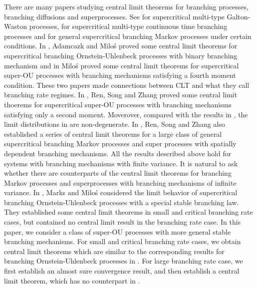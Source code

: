 \documentclass[12pt,a4paper]{amsart}
\theoremstyle{plain}
\theoremstyle{definition}
\numberwithin{equation}{section}
\begin{document}
    There are many papers studying central limit theorems for branching processes, branching diffusions and superprocesses. 
    See \cite{KestenStigum1966A-limit,KestenStigum1966Additional} for supercritical multi-type Galton-Waston processes, \cite{Athreya1969Limit,Athreya1969LimitB,Athreya1971Some} for supercritical multi-type continuous time branching processes and \cite{AsmussenHering1983Branching} for general supercritical branching Markov processes under certain conditions. 
    In \cite{AdamczakMilos2015CLT}, Adamcazk and Milo\'s proved some central limit theorems for supercritical branching Ornstein-Uhlenbeck processes with binary branching mechanism and in \cite{Milos2012Spatial} Milo\'s proved some central limit theorems for supercritical super-OU processes with branching mechanisms satisfying a fourth moment condition. 
    These two papers made connections between CLT and what they call branching rate regimes. 
    In \cite{RenSongZhang2014Central}, Ren, Song and Zhang proved some central limit thoerems for supercritical super-OU processes with branching mechanisms satisfying only a second moment. 
    Moverover, compared with the results in \cite{AdamczakMilos2015CLT,Milos2012Spatial}, the limit distributions in \cite{RenSongZhang2014Central} are non-degenerate. 
    In \cite{RenSongZhang2014CentralB,RenSongZhang2015Central,RenSongZhang2017Central,RenSongZhang2017Functional}, Ren, Song and Zhang also established a series of central limit theorems for a large class of general supercritical branching Markov processes and super processes with spatially dependent branching mechanisms.
    All the results described above hold for systems with branching mechanisms with finite variance. 
    It is natural to ask whether there are counterparts of the central limit theorems for branching Markov processes and superprocesses with branching mechanisms of infinite variance.
    In \cite{MarksMilos2018CLT}, Marks and Milo\'s considered the limit behavior of supercritical branching Ornstein-Uhlenbeck processes with a special stable branching law. They established some central limit theorems in small and critical branching rate cases, but \cite{MarksMilos2018CLT} contained no central limit result in the branching rate case.
    In this paper, we consider a class of super-OU processes with more general stable branching mechanisms. 
    For small and critical branching rate cases, we obtain central limit theorems which are similar to the corresponding results for branching Ornstein-Uhlenbeck processes in \cite{MarksMilos2018CLT}. 
    For large branching rate case, we first establish  an almost sure convergence result, and then establish a central limit theorem, which has no counterpart in \cite{MarksMilos2018CLT}.
\end{document}
